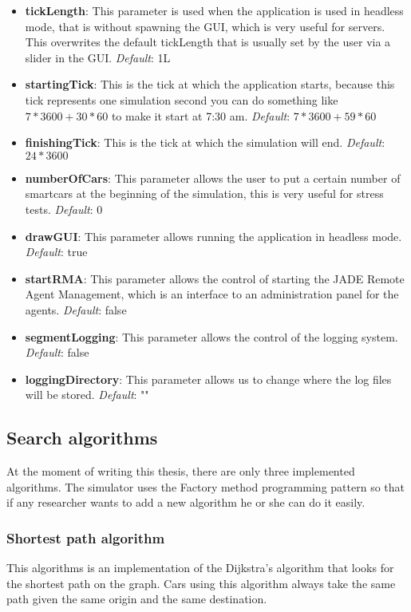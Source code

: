 \begin{itemize}
\item \textbf{tickLength}: This parameter is used when the application is used in headless mode, that is without spawning the GUI, which is very useful for servers. This overwrites the default tickLength that is usually set by the user via a slider in the GUI. \textit{Default}: 1L
\item \textbf{startingTick}: This is the tick at which the application starts, because this tick represents one simulation second you can do something like $7*3600 + 30*60$ to make it start at 7:30 am. \textit{Default}: $7*3600 + 59*60$
\item \textbf{finishingTick}: This is the tick at which the simulation will end. \textit{Default}: $24*3600$
\item \textbf{numberOfCars}: This parameter allows the user to put a certain number of smartcars at the beginning of the simulation, this is very useful for stress tests. \textit{Default}: 0
\item \textbf{drawGUI}: This parameter allows running the application in headless mode. \textit{Default}: true
\item \textbf{startRMA}: This parameter allows the control of starting the JADE Remote Agent Management, which is an interface to an administration panel for the agents. \textit{Default}: false
\item \textbf{segmentLogging}: This parameter allows the control of the logging system. \textit{Default}: false
\item \textbf{loggingDirectory}: This parameter allows us to change where the log files will be stored. \textit{Default}: ""
\end{itemize}

\subsection{Search algorithms}

At the moment of writing this thesis, there are only three implemented algorithms. The simulator uses the Factory method programming pattern \cite{wikipedia_factory} so that if any researcher wants to add a new algorithm he or she can do it easily.

\subsubsection{Shortest path algorithm}

This algorithms is an implementation of the Dijkstra's algorithm \cite{wikipedia_dijkstra} that looks for the shortest path on the graph. Cars using this algorithm always take the same path given the same origin and the same destination.

